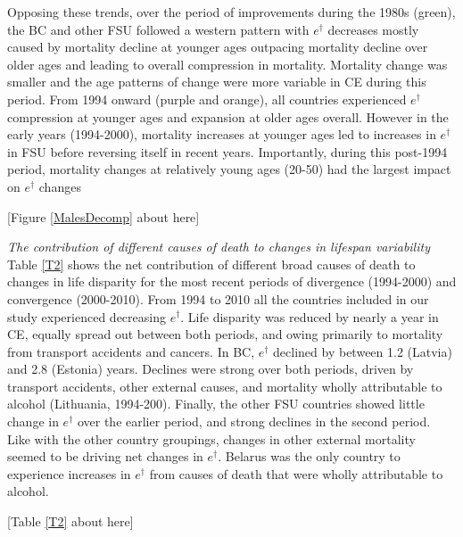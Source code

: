 \documentclass{article}
\begin{document}
\begin{spacing}{1.5}
Opposing these trends, over the period of improvements during the 1980s (green), the BC and other FSU followed a western pattern with $e^\dagger$ decreases mostly caused by mortality decline at younger ages outpacing mortality decline over older ages and leading to overall compression in mortality. Mortality change was smaller and the age patterns of change were more variable in CE during this period. From 1994 onward (purple and orange), all countries experienced $e^\dagger$ compression at younger ages and expansion at older ages overall. However in the early years (1994-2000), mortality increases at younger ages led to increases in $e^\dagger$ in FSU before reversing itself in recent years. Importantly, during this post-1994 period, mortality changes at relatively young ages (20-50) had the largest impact on $e^\dagger$ changes\\



\begin{center}
[Figure \ref{MalesDecomp} about here]\\
\end{center}

\emph{The contribution of different causes of death to changes in lifespan variability}\\

Table \ref{T2} shows the net contribution of different broad causes of death to changes in life disparity for the most recent periods of divergence (1994-2000) and convergence (2000-2010). From 1994 to 2010 all the countries included in our study experienced decreasing $e^\dagger$. Life disparity was reduced by nearly a year in CE, equally spread out between both periods, and owing primarily to mortality from transport accidents and cancers. In BC, $e^\dagger$ declined by between 1.2 (Latvia) and 2.8 (Estonia) years. Declines were strong over both periods, driven by transport accidents, other external causes, and mortality wholly attributable to alcohol (Lithuania, 1994-200). Finally, the other FSU countries showed little change in $e^\dagger$ over the earlier period, and strong declines in the second period. Like with the other country groupings, changes in other external mortality seemed to be driving net changes in $e^\dagger$. Belarus was the only country to experience increases in $e^\dagger$ from causes of death that were wholly attributable to alcohol. \\


\begin{center}
[Table  \ref{T2} about here]\\
\end{center}



\end{spacing}
\end{document}
